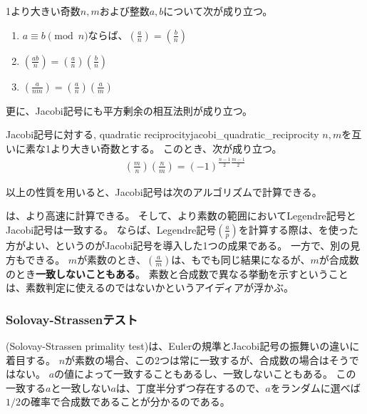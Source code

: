 \begin{Prop}{}{}
1より大きい奇数$n,m$および整数$a,b$について次が成り立つ。
\begin{enumerate}
\item $a\equiv b \pmod{n}$ならば、$\left(\frac{a}{n}\right)=\left(\frac{b}{n}\right)$
\item $\left(\frac{ab}{n}\right)=\left(\frac{a}{n}\right)\left(\frac{b}{n}\right)$
\item $\left(\frac{a}{nm}\right)=\left(\frac{a}{n}\right)\left(\frac{a}{m}\right)$
\end{enumerate}
\end{Prop}

更に、Jacobi記号にも平方剰余の相互法則が成り立つ。

\begin{Theo}{Jacobi記号に対する, quadratic reciprocity}{jacobi_quadratic_reciprocity}
$n,m$を互いに素な1より大きい奇数とする。
このとき、次が成り立つ。
\begin{align*}
\left(\frac{m}{n}\right)\left(\frac{n}{m}\right) = (-1)^{\frac{n-1}{2}\frac{m-1}{2}}
\end{align*}
\end{Theo}

以上の性質を用いると、Jacobi記号は次のアルゴリズムで計算できる。


は、より高速に計算できる。
そして、より素数の範囲においてLegendre記号とJacobi記号は一致する。
ならば、Legendre記号$\left(\frac{a}{p}\right)$を計算する際は、を使った方がよい、というのがJacobi記号を導入した1つの成果である。
一方で、別の見方もできる。
$m$が素数のとき、$\left(\frac{a}{m}\right)$は、もでも同じ結果になるが、$m$が合成数のとき\textbf{一致しないこともある}。
素数と合成数で異なる挙動を示すということは、素数判定に使えるのではないかというアイディアが浮かぶ。

\subsubsection{Solovay-Strassenテスト}
(Solovay-Strassen primality test)\cite{DBLP:journals/siamcomp/SolovayS77}は、Eulerの規準とJacobi記号の振舞いの違いに着目する。
$n$が素数の場合、この2つは常に一致するが、合成数の場合はそうではない。
$a$の値によって一致することもあるし、一致しないこともある。
この一致する$a$と一致しない$a$は、丁度半分ずつ存在するので、$a$をランダムに選べば$1/2$の確率で合成数であることが分かるのである。

